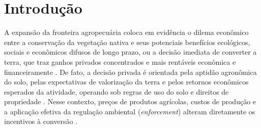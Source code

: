 \section*{Introdução}


\label{sec:introducao}






A expansão da fronteira agropecuária coloca em evidência o dilema econômico entre a conservação da vegetação nativa e seus potenciais benefícios ecológicos, sociais e econômicos difusos de longo prazo, ou a decisão imediata de converter a terra, que traz ganhos privados concentrados e mais rentáveis econômica e financeiramente \cite{Angelsen2010}. De fato, a decisão privada é orientada pela aptidão agronômica do solo, pelas expectativas de valorização da terra e pelos retornos econômicos esperados da atividade, operando sob regras de uso do solo e direitos de propriedade \cite{LubowskiEtAl2008, alstonTitlesConflictLand1999}. Nesse contexto, preços de produtos agrícolas, custos de produção e a aplicação efetiva da regulação ambiental (\textit{enforcement}) alteram diretamente os incentivos à conversão \cite{JungEtAl2022}.

